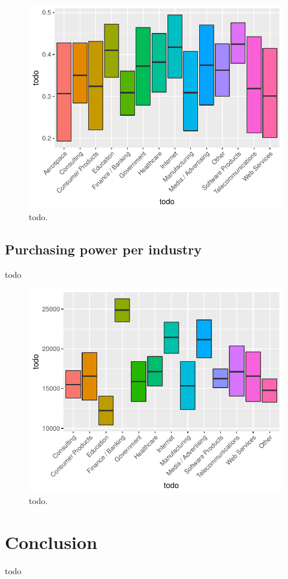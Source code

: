 \documentclass{article}
\begin{document}
\begin{figure}[H]
\centering
\includegraphics{report-034}
\caption{todo.}\label{fig_9}
\end{figure}

\subsection{Purchasing power per industry}
todo





\begin{figure}[H]
\centering
\includegraphics{report-039}
\caption{todo.}\label{fig_10}
\end{figure}

\section{Conclusion}
todo
\end{document}
